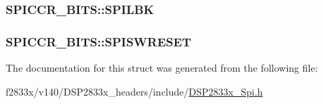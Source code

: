 \subsubsection[{S\+P\+I\+L\+B\+K}]{ S\+P\+I\+C\+C\+R\+\_\+\+B\+I\+T\+S\+::\+S\+P\+I\+L\+B\+K}\label{struct_s_p_i_c_c_r___b_i_t_s_a3b314f4d7704597665ec643bbbfaadc2}
\hypertarget{struct_s_p_i_c_c_r___b_i_t_s_ab4c06f5a85a40d82a90265341db67d50}{}
\subsubsection[{S\+P\+I\+S\+W\+R\+E\+S\+E\+T}]{ S\+P\+I\+C\+C\+R\+\_\+\+B\+I\+T\+S\+::\+S\+P\+I\+S\+W\+R\+E\+S\+E\+T}\label{struct_s_p_i_c_c_r___b_i_t_s_ab4c06f5a85a40d82a90265341db67d50}


The documentation for this struct was generated from the following file\+:\begin{DoxyCompactItemize}
\item 
f2833x/v140/\+D\+S\+P2833x\+\_\+headers/include/\hyperlink{_d_s_p2833x___spi_8h}{D\+S\+P2833x\+\_\+\+Spi.\+h}\end{DoxyCompactItemize}

